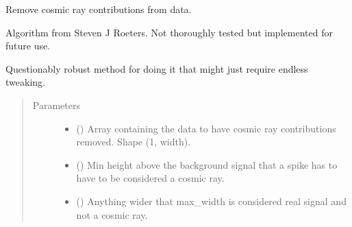 \documentclass[a4paper,10pt,english]{sphinxmanual}
\begin{document}
\begin{fulllineitems}
\begin{fulllineitems}

\begin{fulllineitems}
\label{\detokenize{sfgtools:sfgtools.SFGProcessTools.SFGDataStore.cosmic_bg}}
\end{fulllineitems}


\begin{fulllineitems}
\label{\detokenize{sfgtools:sfgtools.SFGProcessTools.SFGDataStore.cosmic_ray_killer}}
\sphinxAtStartPar
Remove cosmic ray contributions from data.

\sphinxAtStartPar
Algorithm from Steven J Roeters. Not thoroughly tested but implemented for future use.

\sphinxAtStartPar
Questionably robust method for doing it that might just require endless tweaking.
\begin{quote}\begin{description}
\item[{Parameters}] \leavevmode\begin{itemize}
\item {} 
\sphinxAtStartPar
{} () \textendash{} Array containing the data to have cosmic ray contributions removed. Shape (1, width).

\item {} 
\sphinxAtStartPar
{} () \textendash{} Min height above the background signal that a spike has to have to be considered a
cosmic ray.

\item {} 
\sphinxAtStartPar
{} () \textendash{} Anything wider that max\_width is considered real signal and not a cosmic ray.


\end{itemize}
\end{description}
\end{quote}
\end{fulllineitems}
\end{fulllineitems}
\end{fulllineitems}
\end{document}
